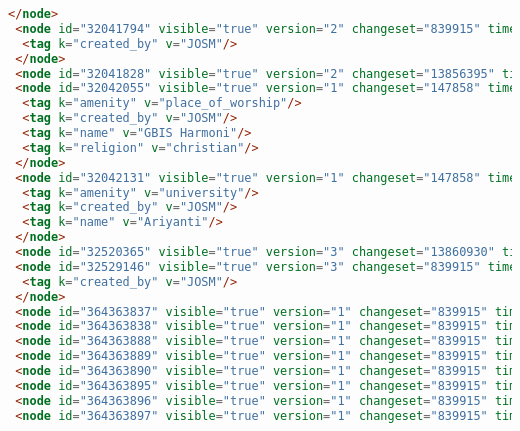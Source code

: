\begin{lstlisting}[language=HTML,basicstyle=\tiny,caption=test.xml]
 </node>
 <node id="32041794" visible="true" version="2" changeset="839915" timestamp="2009-03-21T14:20:08Z" user="adhitya" uid="7748" lat="-6.9049540" lon="107.5990764">
  <tag k="created_by" v="JOSM"/>
 </node>
 <node id="32041828" visible="true" version="2" changeset="13856395" timestamp="2012-11-13T08:27:46Z" user="yudiwbs" uid="268765" lat="-6.9028198" lon="107.5974882"/>
 <node id="32042055" visible="true" version="1" changeset="147858" timestamp="2007-07-16T21:25:13Z" user="adhitya" uid="7748" lat="-6.9045275" lon="107.5973424">
  <tag k="amenity" v="place_of_worship"/>
  <tag k="created_by" v="JOSM"/>
  <tag k="name" v="GBIS Harmoni"/>
  <tag k="religion" v="christian"/>
 </node>
 <node id="32042131" visible="true" version="1" changeset="147858" timestamp="2007-07-16T21:25:27Z" user="adhitya" uid="7748" lat="-6.9050969" lon="107.5973817">
  <tag k="amenity" v="university"/>
  <tag k="created_by" v="JOSM"/>
  <tag k="name" v="Ariyanti"/>
 </node>
 <node id="32520365" visible="true" version="3" changeset="13860930" timestamp="2012-11-13T15:42:42Z" user="yudiwbs" uid="268765" lat="-6.9068829" lon="107.5976578"/>
 <node id="32529146" visible="true" version="3" changeset="839915" timestamp="2009-03-21T14:16:03Z" user="adhitya" uid="7748" lat="-6.9071333" lon="107.6033567">
  <tag k="created_by" v="JOSM"/>
 </node>
 <node id="364363837" visible="true" version="1" changeset="839915" timestamp="2009-03-21T14:02:46Z" user="adhitya" uid="7748" lat="-6.9109164" lon="107.5979263"/>
 <node id="364363838" visible="true" version="1" changeset="839915" timestamp="2009-03-21T14:02:48Z" user="adhitya" uid="7748" lat="-6.9103801" lon="107.5978906"/>
 <node id="364363888" visible="true" version="1" changeset="839915" timestamp="2009-03-21T14:03:09Z" user="adhitya" uid="7748" lat="-6.9055397" lon="107.5965000"/>
 <node id="364363889" visible="true" version="1" changeset="839915" timestamp="2009-03-21T14:03:10Z" user="adhitya" uid="7748" lat="-6.9056185" lon="107.5965003"/>
 <node id="364363890" visible="true" version="1" changeset="839915" timestamp="2009-03-21T14:03:10Z" user="adhitya" uid="7748" lat="-6.9056188" lon="107.5964229"/>
 <node id="364363895" visible="true" version="1" changeset="839915" timestamp="2009-03-21T14:03:14Z" user="adhitya" uid="7748" lat="-6.9057778" lon="107.5964236"/>
 <node id="364363896" visible="true" version="1" changeset="839915" timestamp="2009-03-21T14:03:15Z" user="adhitya" uid="7748" lat="-6.9057775" lon="107.5964918"/>
 <node id="364363897" visible="true" version="1" changeset="839915" timestamp="2009-03-21T14:03:17Z" user="adhitya" uid="7748" lat="-6.9061063" lon="107.5964919"/>

\end{lstlisting}
